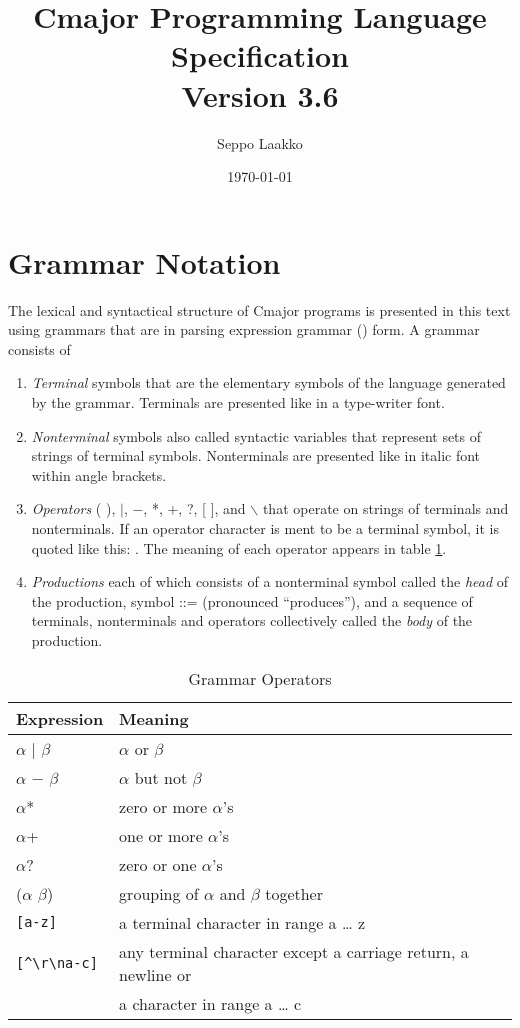 \documentclass[a4paper,oneside,11pt]{article}
\begin{document}
\title{Cmajor Programming Language Specification\\Version 3.6}
\author{Seppo Laakko}
\date{\today}
\maketitle
\tableofcontents

\clearpage

\section{Grammar Notation}

The lexical and syntactical structure of Cmajor programs is presented in this text
using grammars that are in parsing expression grammar (\cite{PEG}) form.
A grammar consists of

\begin{enumerate}
\item
\emph{Terminal} symbols that are the elementary symbols of the language generated by the grammar.
Terminals are presented like  in a type-writer font.
\item
\emph{Nonterminal} symbols also called syntactic variables that represent sets of strings of terminal symbols.
Nonterminals are presented like  in italic font within angle brackets.
\item
\emph{Operators} ( ), $|$, $-$, *, +, ?, [ ], and $\backslash$ that operate on strings of terminals and nonterminals.
If an operator character is ment to be a terminal symbol, it is quoted like this: \lit{*}.
The meaning of each operator appears in table \ref{tab:operators}.
\item
\emph{Productions} each of which consists of a nonterminal symbol called the \emph{head} of the production, symbol ::= (pronounced ``produces''), and
a sequence of terminals, nonterminals and operators collectively called the \emph{body} of the production.
\end{enumerate}

\begin{table}[htb]
\caption{Grammar Operators}\label{tab:operators}
\begin{tabular}{ll}
\bf{Expression}& \bf{Meaning}\\
\hline
$\alpha$ $|$ $\beta$ & $\alpha$ or $\beta$\\
$\alpha$ $-$ $\beta$ & $\alpha$ but not $\beta$\\
$\alpha$* & zero or more $\alpha$'s\\
$\alpha$+ & one or more $\alpha$'s\\
$\alpha$? & zero or one $\alpha$'s\\
($\alpha$ $\beta$) & grouping of $\alpha$ and $\beta$ together\\
\verb|[a-z]| & a terminal character in range a \ldots{} z\\
\verb|[^\r\na-c]| & any terminal character except a carriage return, a newline or\\& a character in range a \ldots{} c\\
\end{tabular}
\end{table}
\end{document}
